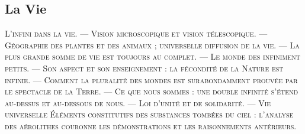\documentclass[a4paper, 11pt, oneside, landscape]{article}
\begin{document}
\subsection{La Vie}
\begin{center}
\scshape
\small
L'infini dans la vie. --- Vision microscopique et vision télescopique. --- Géographie des plantes et des animaux ; universelle diffusion de la vie. --- La plus grande somme de vie est toujours au complet. --- Le monde des infiniment petits. --- Son aspect et son enseignement : la fécondité de la Nature est infinie. --- Comment la pluralité des mondes est surabondamment prouvée par le spectacle de la Terre. --- Ce que nous sommes : une double infinité s'étend au-dessus et au-dessous de nous. --- Loi d'unité et de solidarité. --- Vie universelle Éléments constitutifs des substances tombées du ciel : l'analyse des aérolithes couronne les démonstrations et les raisonnements antérieurs.
\end{center}
\end{document}
